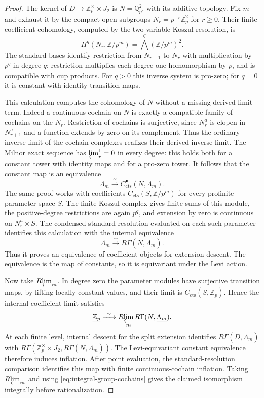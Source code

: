\documentclass[11pt]{article}
\numberwithin{equation}{section}
\theoremstyle{definition}
\theoremstyle{remark}
\begin{document}
\begin{proof}
The kernel of $D\to\mathbb Z_p^\times\times J_2$ is
$N=\mathbb Q_p^2$, with its additive topology.
Fix $m$ and exhaust it by the compact open subgroups
$N_r=p^{-r}\mathbb Z_p^2$ for $r\geq0$.  Their finite-coefficient
cohomology, computed by the two-variable Koszul resolution, is
\[
 H^q(N_r,\mathbb Z/p^m)=\bigwedge^q(\mathbb Z/p^m)^2.
\]
The standard bases identify restriction from $N_{r+1}$ to $N_r$
with multiplication by $p^q$ in degree $q$: restriction multiplies
each degree-one homomorphism by $p$, and is compatible with cup
products.  For $q>0$ this inverse system is pro-zero; for $q=0$
it is constant with identity transition maps.

This calculation computes the cohomology of $N$ without a missing
derived-limit term.  Indeed a continuous cochain on $N$ is exactly
a compatible family of cochains on the $N_r$.
Restriction of cochains is surjective, since $N_r^a$ is clopen in
$N_{r+1}^a$ and a function extends by zero on its complement.
Thus the ordinary inverse limit of the cochain complexes realizes
their derived inverse limit.  The Milnor exact sequence has
$\varprojlim^1_r=0$ in every degree: this holds both for a constant
tower with identity maps and for a pro-zero tower.  It follows that
the constant map is an equivalence
\[
 \Lambda_m\xrightarrow{\ \sim\ }C_{\mathrm{cts}}^{\bullet}(N,\Lambda_m).
\]
The same proof works with coefficients
$C_{\mathrm{cts}}(S,\mathbb Z/p^m)$ for every profinite parameter space $S$.
The finite Koszul complex gives finite sums of this module, the
positive-degree restrictions are again $p^q$, and extension by
zero is continuous on $N_r^a\times S$.
The condensed standard resolution evaluated on each such parameter
identifies this calculation with the internal equivalence
\[
 \underline{\Lambda_m}\xrightarrow{\ \sim\ }
       R\Gamma(N,\underline{\Lambda_m}).
\]
Thus it proves an equivalence of coefficient objects for extension
descent.  The equivalence is the map of constants, so it is equivariant
under the Levi action.

Now take $R\!\varprojlim_m$.  In degree zero the parameter modules have
surjective transition maps, by lifting locally constant values,
and their limit is $C_{\mathrm{cts}}(S,\mathbb Z_p)$.
Hence the internal coefficient limit satisfies
\[
 \underline{\mathbb Z_p}\xrightarrow{\ \sim\ }
       R\!\varprojlim_m R\Gamma(N,\underline{\Lambda_m}).
\]
At each finite level, internal descent for the split extension identifies
$R\Gamma(D,\underline{\Lambda_m})$ with
$R\Gamma(\mathbb Z_p^\times\times J_2,
R\Gamma(N,\underline{\Lambda_m}))$.
The Levi-equivariant constant equivalence therefore induces inflation.
After point evaluation, the standard-resolution comparison identifies
this map with finite continuous-cochain inflation.  Taking $R\!\varprojlim_m$
and using \eqref{eq:integral-group-cochains} gives the claimed
isomorphism integrally before rationalization.


\end{proof}
\end{document}
